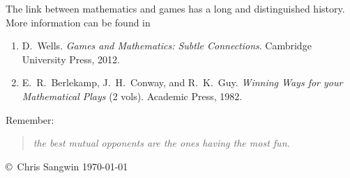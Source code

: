 \documentclass[11pt]{article}
\begin{document}
The link between mathematics and games has a long and distinguished history.  More information can be found in
\begin{enumerate}
  \item D.~Wells.  {\em Games and Mathematics: Subtle Connections}.  Cambridge University Press, 2012.
  \item E.~R.~Berlekamp, J.~H.~Conway, and R.~K.~Guy.  {\em Winning Ways for your Mathematical Plays} (2 vols). Academic Press, 1982.
\end{enumerate}


Remember:
\begin{quote}
    {\em the best mutual opponents are the ones having the most fun.}
\end{quote}
\vfill
{{\tiny\sf \copyright\ Chris Sangwin \today}}%
\end{document}
